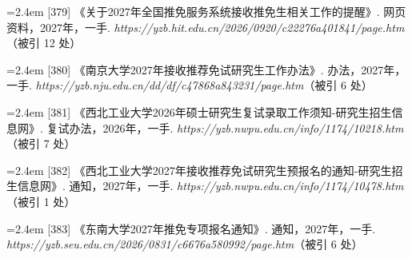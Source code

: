 {\vspace{0.6pt}
\vspace{3.5pt}\par
\nopagebreak\vspace{1pt}
\noindent\hangindent=2.4em \label{src:S0504}{\color{cAccent}[379]} 《关于2027年全国推免服务系统接收推免生相关工作的提醒》. 网页资料，2027年，一手. \textit{https://yzb.hit.edu.cn/2026/0920/c22276a401841/page.htm}（被引 12 处）\par
\vspace{0.6pt}
\vspace{3.5pt}\par
\nopagebreak\vspace{1pt}
\noindent\hangindent=2.4em \label{src:S0505}{\color{cAccent}[380]} 《南京大学2027年接收推荐免试研究生工作办法》. 办法，2027年，一手. \textit{https://yzb.nju.edu.cn/dd/df/c47868a843231/page.htm}（被引 6 处）\par
\vspace{0.6pt}
\vspace{3.5pt}\par
\nopagebreak\vspace{1pt}
\noindent\hangindent=2.4em \label{src:S0506}{\color{cAccent}[381]} 《西北工业大学2026年硕士研究生复试录取工作须知-研究生招生信息网》. 复试办法，2026年，一手. \textit{https://yzb.nwpu.edu.cn/info/1174/10218.htm}（被引 7 处）\par
\vspace{0.6pt}
\noindent\hangindent=2.4em \label{src:S0507}{\color{cAccent}[382]} 《西北工业大学2027年接收推荐免试研究生预报名的通知-研究生招生信息网》. 通知，2027年，一手. \textit{https://yzb.nwpu.edu.cn/info/1174/10478.htm}（被引 1 处）\par
\vspace{0.6pt}
\vspace{3.5pt}\par
\nopagebreak\vspace{1pt}
\noindent\hangindent=2.4em \label{src:S0512}{\color{cAccent}[383]} 《东南大学2027年推免专项报名通知》. 通知，2027年，一手. \textit{https://yzb.seu.edu.cn/2026/0831/c6676a580992/page.htm}（被引 6 处）\par
\vspace{0.6pt}
\vspace{3.5pt}\par
}
